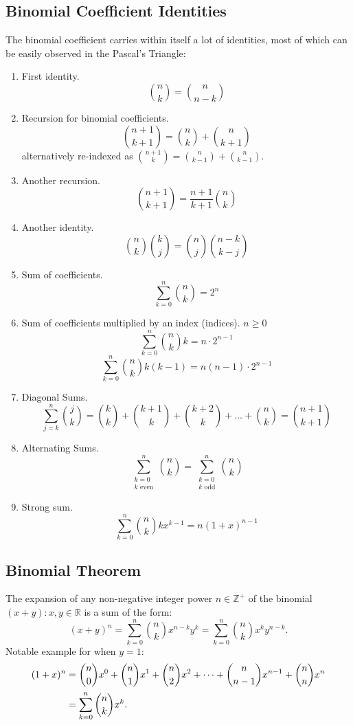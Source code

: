 \documentclass{article}
\newenvironment{theorem}[1]{%
    \trivlist
    \item[\hskip\labelsep\textbf{Theorem. #1.}]
    \ignorespaces
}{%
    \endtrivlist
}
\newenvironment{identities}[1]{%
    \trivlist
    \item[\hskip\labelsep\textbf{Identities. #1.}]
    \ignorespaces
}{%
    \endtrivlist
}
\begin{document}
\subsection{Binomial Coefficient Identities}

\begin{identities}{Binomial Coefficient}
    The binomial coefficient carries within itself a lot of identities, most of which can be easily observed in the Pascal's Triangle:
    \begin{enumerate}
        \item First identity.
        \[\binom{n}{k}=\binom{n}{n-k}\]
        \item Recursion for binomial coefficients.
        \[\binom{n+1}{k+1}=\binom{n}{k}+\binom{n}{k+1}\]
        alternatively re-indexed as $\binom{n+1}{k}=\binom{n}{k-1}+\binom{n}{k-1}$.
        \item Another recursion.
        \[\binom{n+1}{k+1} = \frac{n+1}{k+1} \binom{n}{k}\]
        \item Another identity.
        \[\binom{n}{k}\binom{k}{j} = \binom{n}{j}\binom{n-k}{k-j}\]
        \item Sum of coefficients.
        \[\sum_{k=0}^{n} \binom{n}{k} = 2^n\]
        \item Sum of coefficients multiplied by an index (indices). $n\geq 0$
        \[\sum_{k=0}^{n} \binom{n}{k} k  = n\cdot 2^{n-1}\]
        \[\sum_{k=0}^{n} \binom{n}{k} k(k-1)  = n(n-1)\cdot 2^{n-1}\]
        \item Diagonal Sums.
        \[\sum_{j=k}^{n} \binom{j}{k}=\binom{k}{k} + \binom{k+1}{k} + \binom{k+2}{k} + \dots + \binom{n}{k} = \binom{n+1}{k+1}\]
        \item Alternating Sums.
        \[\sum_{\substack{k=0 \\ k \text{ even}}}^{n} \binom{n}{k} =\sum_{\substack{k=0 \\ k \text{ odd}}}^{n} \binom{n}{k}\]
        \item Strong sum.
        \[\sum_{k=0}^{n} \binom{n}{k} kx^{k-1} = n(1+x)^{n-1}\]
    \end{enumerate}
\end{identities}

\subsection{Binomial Theorem}

\begin{theorem}{Binomial Theorem}
    The expansion of any non-negative integer power $n\in\mathbb{Z}^{+}$ of the binomial $(x + y): x,y\in\mathbb{R}$ is a sum of the form:
    \[ (x+y)^{n}=\sum _{k=0}^{n} \binom{n}{k} x^{n-k}y^{k}=\sum _{k=0}^{n} \binom{n}{k} x^{k}y^{n-k}. \]
    Notable example for when $y=1$:
    $$
    \begin{aligned}
        (1+x)^{n}&=\binom{n}{0}x^{0}+\binom{n}{1}x^{1}+\binom{n}{2}x^{2}+\cdots +\binom{n}{n-1}x^{n-1}+\binom{n}{n}x^{n}\\
        &=\sum _{k=0}^{n}\binom{n}{k}x^{k}.{\vphantom {\Bigg )}}
    \end{aligned}
    $$
\end{theorem}
\end{document}
